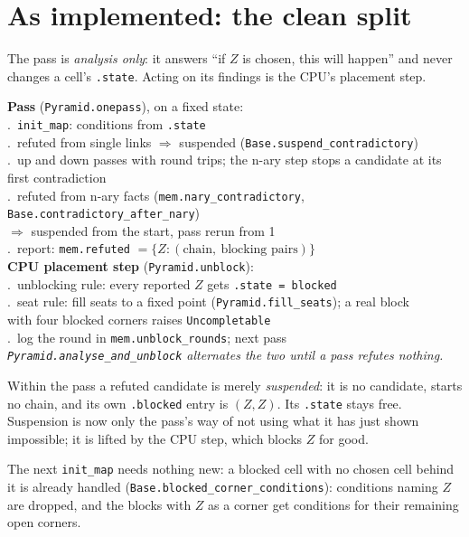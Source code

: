 \documentclass[10pt,a4paper]{article}
\newcommand{\code}[1]{\texttt{#1}}
\newenvironment{algebra}{\begin{center}\begin{minipage}{0.92\linewidth}\small\setlength{\parskip}{0.2em}}{\end{minipage}\end{center}}
\newcommand{\cmt}[1]{{\color{inksoft}\textit{#1}}}
\begin{document}
\section{As implemented: the clean split}

The pass is \emph{analysis only}: it answers ``if $Z$ is chosen, this will happen'' and never changes a cell's \code{.state}. Acting on its findings is the CPU's placement step.

\begin{algebra}\raggedright
\textbf{Pass} (\code{Pyramid.onepass}), on a fixed state:\\
.\ \code{init\_map}: conditions from \code{.state}\\
.\ refuted from single links $\Rightarrow$ suspended (\code{Base.suspend\_contradictory})\\
.\ up and down passes with round trips; the n-ary step stops a candidate at its first contradiction\\
.\ refuted from n-ary facts (\code{mem.nary\_contradictory}, \code{Base.contradictory\_after\_nary})\\
\qquad $\Rightarrow$ suspended from the start, pass rerun from 1\\
.\ report: \code{mem.refuted} $=\{Z: (\text{chain},\ \text{blocking pairs})\}$\\[0.4em]
\textbf{CPU placement step} (\code{Pyramid.unblock}):\\
.\ unblocking rule: every reported $Z$ gets \code{.state = blocked}\\
.\ seat rule: fill seats to a fixed point (\code{Pyramid.fill\_seats}); a real block\\
\qquad with four blocked corners raises \code{Uncompletable}\\
.\ log the round in \code{mem.unblock\_rounds}; next pass\\[0.4em]
\cmt{\code{Pyramid.analyse\_and\_unblock} alternates the two until a pass refutes nothing.}
\end{algebra}

Within the pass a refuted candidate is merely \emph{suspended}: it is no candidate, starts no chain, and its own \code{.blocked} entry is $(Z,Z)$. Its \code{.state} stays free. Suspension is now only the pass's way of not using what it has just shown impossible; it is lifted by the CPU step, which blocks $Z$ for good.

The next \code{init\_map} needs nothing new: a blocked cell with no chosen cell behind it is already handled (\code{Base.blocked\_corner\_conditions}): conditions naming $Z$ are dropped, and the blocks with $Z$ as a corner get conditions for their remaining open corners.
\end{document}

